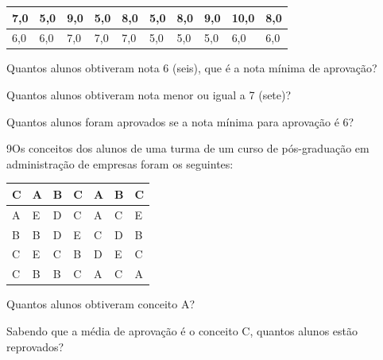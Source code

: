 \begin{longtable}[]{@{}llllllllll@{}}
\toprule
7,0 & 5,0 & 9,0 & 5,0 & 8,0 & 5,0 & 8,0 & 9,0 & 10,0 &
8,0\tabularnewline
\midrule
\endhead
6,0 & 6,0 & 7,0 & 7,0 & 7,0 & 5,0 & 5,0 & 5,0 & 6,0 & 6,0\tabularnewline
\bottomrule
\end{longtable}

\begin{escolha}
\item
  Quantos alunos obtiveram nota 6 (seis), que é a nota mínima de aprovação?


\reduline{\mbox{}\hfill}

\reduline{\mbox{}\hfill}

\item
  Quantos alunos obtiveram nota menor ou igual a 7 (sete)?


\reduline{\mbox{}\hfill}

\reduline{\mbox{}\hfill}

\item
  Quantos alunos foram aprovados se a nota mínima para aprovação é 6?


\reduline{\mbox{}\hfill}

\reduline{\mbox{}\hfill}
\end{escolha}

\pagebreak

\num{9}Os conceitos dos alunos de uma turma de um curso de pós-graduação
em administração de empresas foram os seguintes:

\begin{longtable}[]{@{}lllllll@{}}
\toprule
C & A & B & C & A & B & C\tabularnewline
\midrule
\endhead
A & E & D & C & A & C & E\tabularnewline
B & B & D & E & C & D & B\tabularnewline
C & E & C & B & D & E & C\tabularnewline
C & B & B & C & A & C & A\tabularnewline
\bottomrule
\end{longtable}

\begin{escolha}
\item
  Quantos alunos obtiveram conceito A?


\reduline{\mbox{}\hfill}

\reduline{\mbox{}\hfill}

\item
  Sabendo que a média de aprovação é o conceito C, quantos alunos estão
  reprovados?


\reduline{\mbox{}\hfill}

\reduline{\mbox{}\hfill}
\end{escolha}

